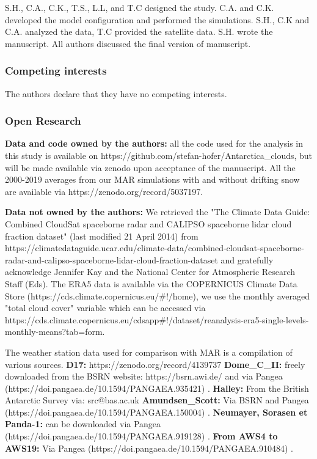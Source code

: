 \documentclass[draft]{agujournal2019}
\begin{document}
S.H., C.A., C.K., T.S., L.L, and T.C designed the study. C.A. and C.K. developed the model configuration and performed the simulations. S.H., C.K and C.A. analyzed the data, T.C provided the satellite data. S.H. wrote the manuscript. All authors discussed the final version of manuscript.

\subsubsection*{Competing interests}
The authors declare that they have no competing interests.

\subsubsection*{Open Research}

%
\textbf{Data and code owned by the authors:} all the code used for the analysis in this study is available on https://github.com/stefan-hofer/Antarctica\_clouds, but will be made available via zenodo upon acceptance of the manuscript. All the 2000-2019 averages from our MAR simulations with and without drifting snow are available via \hfill \break  https://zenodo.org/record/5037197. 


\textbf{Data not owned by the authors:} We retrieved the "The Climate Data Guide: Combined CloudSat spaceborne radar and CALIPSO spaceborne lidar cloud fraction dataset" (last modified 21 April 2014) from https://climatedataguide.ucar.edu/climate-data/combined-cloudsat-spaceborne-radar-and-calipso-spaceborne-lidar-cloud-fraction-dataset and gratefully acknowledge Jennifer Kay and the National Center for Atmospheric Research Staff (Eds). The ERA5 data is available via the COPERNICUS Climate Data Store \hfill \break 
(https://cds.climate.copernicus.eu/\#!/home), we use the monthly averaged "total cloud cover" variable which can be accessed via https://cds.climate.copernicus.eu/cdsapp\#!/dataset/reanalysis-era5-single-levels-monthly-means?tab=form.

The weather station data used for comparison with MAR is a compilation of various sources.\hfill \break 
\textbf{D17:} https://zenodo.org/record/4139737 \hfill \break 
\textbf{Dome\_C\_II:} freely downloaded from the BSRN website: https://bsrn.awi.de/ and via Pangea (https://doi.pangaea.de/10.1594/PANGAEA.935421) \cite{lupi2021}.\hfill \break 
\textbf{Halley:} From the British Antarctic Survey via: src@bas.ac.uk \hfill \break 
\textbf{Amundsen\_Scott:} Via BSRN and Pangea (https://doi.pangaea.de/10.1594/PANGAEA.150004) \cite{dutton2015}.\hfill \break 
\textbf{Neumayer, Sorasen et Panda-1:} can be downloaded via Pangea \\
(https://doi.pangaea.de/10.1594/PANGAEA.919128) \cite{schmithusen2020}. \hfill \break 
\textbf{From AWS4 to AWS19:} Via Pangea (https://doi.pangaea.de/10.1594/PANGAEA.910484) \cite{jakobs2020}. \hfill \break 
\end{document}
